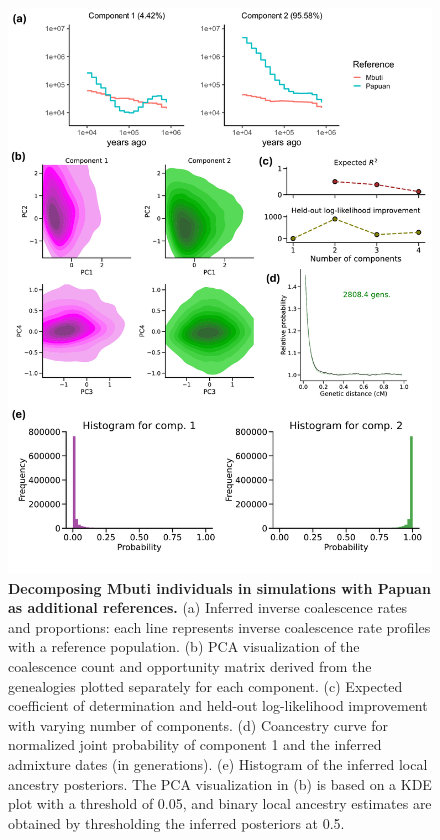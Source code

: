 \begin{figure}[h!]
    \centering
    \includegraphics[width=\linewidth]{figures/gb_sims/gb_sim_deni_noadmix.pdf}
    \captionsetup{width=\textwidth+3cm}     \caption{
    \footnotesize
    \textbf{Decomposing Mbuti individuals in simulations with Papuan as additional references.} (a) Inferred inverse coalescence rates and proportions: each line represents inverse coalescence rate profiles with a reference population. (b) PCA visualization of the coalescence count and opportunity matrix derived from the genealogies plotted separately for each component. (c) Expected coefficient of determination and held-out log-likelihood improvement with varying number of components. (d) Coancestry curve for normalized joint probability of component 1 and the inferred admixture dates (in generations). (e) Histogram of the inferred local ancestry posteriors. The PCA visualization in (b) is based on a KDE plot with a threshold of 0.05, and binary local ancestry estimates are obtained by thresholding the inferred posteriors at 0.5.
    }
    \label{fig:gb_sim_deni_noadmix}
\end{figure}

